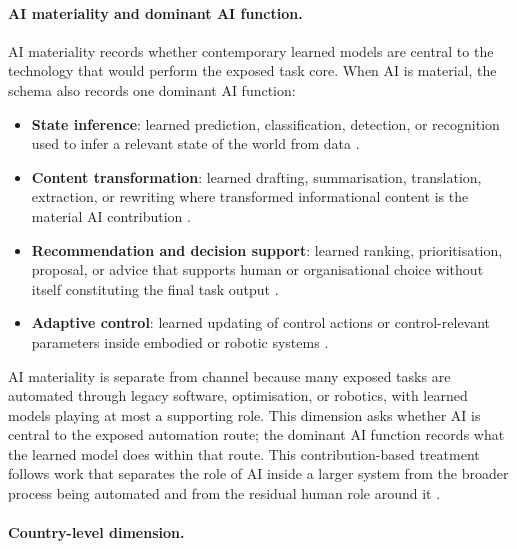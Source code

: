 \documentclass[11pt]{article}
\begin{document}
\paragraph{AI materiality and dominant AI function.} AI materiality records whether contemporary learned models are central to the technology that would perform the exposed task core. When AI is material, the schema also records one dominant AI function:
\begin{itemize}[leftmargin=*,itemsep=0.1em,topsep=0.3em]
    \item \textbf{State inference}: learned prediction, classification, detection, or recognition used to infer a relevant state of the world from data \citep{BrynjolfssonMitchellRock2018,Webb2020}.
    \item \textbf{Content transformation}: learned drafting, summarisation, translation, extraction, or rewriting where transformed informational content is the material AI contribution \citep{EloundouEtAl2024,BrynjolfssonLiRaymond2023GenerativeAIatWork,NoyZhang2023ProductivityEffectsGenAI}.
    \item \textbf{Recommendation and decision support}: learned ranking, prioritisation, proposal, or advice that supports human or organisational choice without itself constituting the final task output \citep{Puranam2021HACD,AmershiEtAl2019HumanAIInteraction}.
    \item \textbf{Adaptive control}: learned updating of control actions or control-relevant parameters inside embodied or robotic systems \citep{GuoPan2023AdaptiveRobotControl}.
\end{itemize}
AI materiality is separate from channel because many exposed tasks are automated through legacy software, optimisation, or robotics, with learned models playing at most a supporting role. This dimension asks whether AI is central to the exposed automation route; the dominant AI function records what the learned model does within that route. This contribution-based treatment follows work that separates the role of AI inside a larger system from the broader process being automated and from the residual human role around it \citep{AmershiEtAl2019HumanAIInteraction,Puranam2021HACD,RaischKrakowski2021AutomationAugmentation}.

\paragraph{Country-level dimension.}
\label{sec:methods_benchmark}
\end{document}
